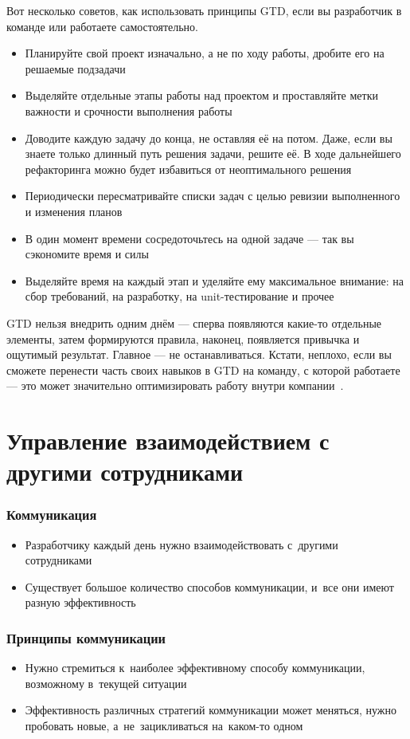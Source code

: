 \documentclass{../industrial-development}
\begin{document}
\lecturenotes

Вот несколько советов, как использовать принципы GTD, если вы разработчик в команде или работаете самостоятельно.

  \begin{itemize}
  \item Планируйте свой проект изначально, а не по ходу работы, дробите его на решаемые подзадачи
  \item Выделяйте отдельные этапы работы над проектом и проставляйте метки важности и срочности выполнения работы
  \item Доводите каждую задачу до конца, не оставляя её на потом. Даже, если вы знаете только длинный путь решения задачи, решите её. В ходе дальнейшего рефакторинга можно будет избавиться от неоптимального решения
  \item Периодически пересматривайте списки задач с целью ревизии выполненного и изменения планов
  \item В один момент времени сосредоточьтесь на одной задаче — так вы сэкономите время и силы
  \item Выделяйте время на каждый этап и уделяйте ему максимальное внимание: на сбор требований, на разработку, на unit-тестирование и прочее
  \end{itemize}

GTD нельзя внедрить одним днём — сперва появляются какие-то отдельные элементы, затем формируются правила, наконец, появляется привычка и ощутимый результат. Главное — не останавливаться. Кстати, неплохо, если вы сможете перенести часть своих навыков в GTD на команду, с которой работаете — это может значительно оптимизировать работу внутри компании~\cite{GTDHabr}.

\section{Управление взаимодействием с другими сотрудниками}

\begin{frame} \frametitle{Коммуникация}
  \begin{itemize}
  \item Разработчику каждый день нужно взаимодействовать с~другими сотрудниками
  \item Существует большое количество способов коммуникации, и~все они имеют разную эффективность
  \end{itemize}
\end{frame}

\begin{frame} \frametitle{Принципы коммуникации}
	\begin{itemize}
		\item Нужно стремиться к~наиболее эффективному способу коммуникации, возможному в~текущей ситуации
		\item Эффективность различных стратегий коммуникации может меняться, нужно пробовать новые, а~не~зацикливаться на~каком-то одном
	\end{itemize}
\end{frame}
\end{document}
